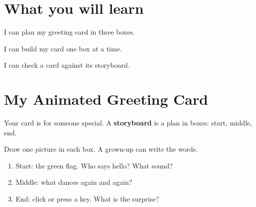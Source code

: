 
\section{What you will learn}
\begin{ican}
  \item I can plan my greeting card in three boxes.
  \item I can build my card one box at a time.
  \item I can check a card against its storyboard.
\end{ican}

\section{My Animated Greeting Card}
Your card is for someone special. A \textbf{storyboard} is a plan in boxes: start, middle, end.

\begin{exercise}[My Storyboard]
Draw one picture in each box. A grown-up can write the words.
\begin{center}
\end{center}
\begin{enumerate}[leftmargin=1.4em,itemsep=2pt]
  \item Start: the green flag. Who says hello? What sound?
  \item Middle: what dances again and again?
  \item End: click or press a key. What is the surprise?
\end{enumerate}
\end{exercise}

